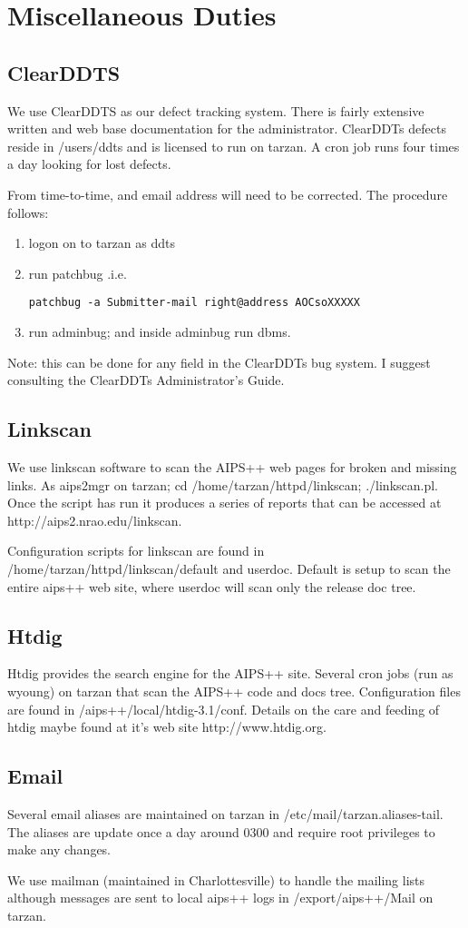 \chapter{Miscellaneous Duties}
\section{ClearDDTS}
We use ClearDDTS as our defect tracking system.  There is fairly extensive
written and web base documentation for the administrator.  ClearDDTs defects
reside in /users/ddts and is licensed to run on tarzan. A cron job runs four
times a day looking for lost defects.

From time-to-time, and email address will need to be corrected. The procedure follows:
\begin{enumerate}
\item logon on to tarzan as ddts
\item run patchbug .i.e.
\begin{verbatim}
patchbug -a Submitter-mail right@address AOCsoXXXXX
\end{verbatim}
\item run adminbug; and inside adminbug run dbms.
\end{enumerate}
Note: this can be done for any field in the ClearDDTs bug system.  I suggest  
consulting the ClearDDTs Administrator's Guide.
\section{Linkscan}
We use linkscan software to scan the AIPS++ web pages for broken and missing
links.  As aips2mgr on tarzan; cd /home/tarzan/httpd/linkscan; ./linkscan.pl.
Once the script has run it produces a series of reports that can be accessed
at http://aips2.nrao.edu/linkscan.

Configuration scripts for linkscan are found in
/home/tarzan/httpd/linkscan/default and userdoc.  Default is setup to scan the
entire aips++ web site, where userdoc will scan only the release doc tree.
\section{Htdig}
Htdig provides the search engine for the AIPS++ site.  Several cron jobs 
(run as wyoung) 
on tarzan that scan the AIPS++ code and docs tree.  Configuration files are found
in /aips++/local/htdig-3.1/conf.  Details on the care and feeding of htdig maybe
found at it's web site http://www.htdig.org.

\section{Email}
Several email aliases are maintained on tarzan in /etc/mail/tarzan.aliases-tail.
The aliases are update once a day around 0300 and require root privileges to 
make any changes.

We use mailman 
(maintained in Charlottesville) to handle the mailing lists although messages are
sent to local aips++ logs in /export/aips++/Mail on tarzan.
